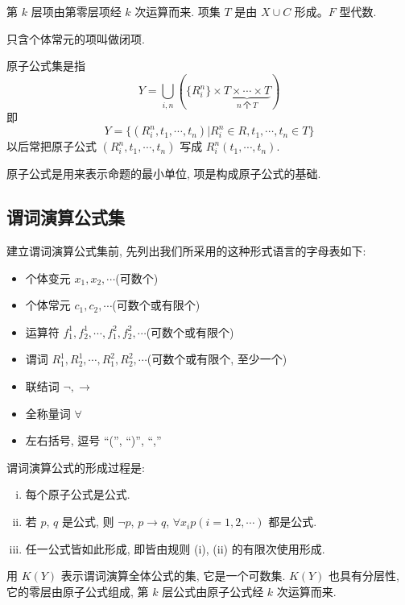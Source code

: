 \documentclass[
    color=black,
    device=normal,
    lang=cn
]{elegantnote}
\begin{document}
第 $k$ 层项由第零层项经 $k$ 次运算而来. 项集 $T$ 是由 $X\cup C$ 形成。$F$ 型代数.
\begin{definition}[闭项]
    只含个体常元的项叫做闭项.
\end{definition}
\begin{definition}[原子公式集]
    原子公式集是指
    $$
        Y=\bigcup_{i,n} \left(\{R_i^n\}\times \underbrace{T\times\cdots\times T}_{n\ \text{个}\ T} \right)
    $$
    即
    $$
        Y=\{(R_i^n, t_1, \cdots, t_n)\vert R_i^n\in R, t_1, \cdots, t_n \in T\}
    $$
    以后常把原子公式 $(R_i^n, t_1, \cdots, t_n)$ 写成 $R_i^n(t_1, \cdots, t_n)$.
\end{definition}
原子公式是用来表示命题的最小单位, 项是构成原子公式的基础.
\subsection{谓词演算公式集}
建立谓词演算公式集前, 先列出我们所采用的这种形式语言的字母表如下:
\begin{itemize}[listparindent = 2em]
    \item 个体变元 $x_1, x_2, \cdots$\hfill (可数个)
    \item 个体常元 $c_1, c_2, \cdots$\hfill (可数个或有限个)
    \item 运算符 $f_1^1, f_2^1, \cdots, f_1^2, f_2^2, \cdots$\hfill (可数个或有限个)
    \item 谓词 $R_1^1, R_2^1, \cdots, R_1^2, R_2^2, \cdots$\hfill (可数个或有限个, 至少一个)
    \item 联结词 $\lnot, \to$
    \item 全称量词 $\forall$
    \item 左右括号, 逗号 ``('', ``)'', ``,''
\end{itemize}
谓词演算公式的形成过程是:
\begin{enumerate}[(i)]
    \item 每个原子公式是公式.
    \item 若 $p$, $q$ 是公式, 则 $\lnot p$, $p\to q$, $\forall x_i p(i = 1, 2, \cdots)$ 都是公式.
    \item 任一公式皆如此形成, 即皆由规则 (i), (ii) 的有限次使用形成.
\end{enumerate}
用 $K(Y)$ 表示谓词演算全体公式的集, 它是一个可数集. $K(Y)$ 也具有分层性, 它的零层由原子公式组成, 第 $k$ 层公式由原子公式经 $k$ 次运算而来.
\end{document}
